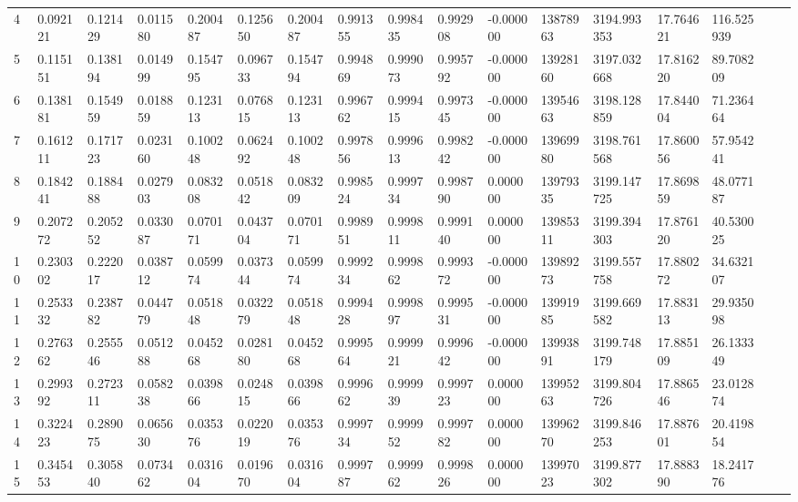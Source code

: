\documentclass{article}
\begin{document}
\begin{center}
\begin{tiny}
\begin{tabular}{|l*{16}{l|}}
4 & 0.092121 & 0.121429 & 0.011580 & 0.200487 & 0.125650 & 0.200487 & 0.991355 & 0.998435 & 0.992908 & -0.000000 & 13878963 & 3194.993353 & 17.764621 & 116.525939 \\
5 & 0.115151 & 0.138194 & 0.014999 & 0.154795 & 0.096733 & 0.154794 & 0.994869 & 0.999073 & 0.995792 & -0.000000 & 13928160 & 3197.032668 & 17.816220 & 89.708209 \\
6 & 0.138181 & 0.154959 & 0.018859 & 0.123113 & 0.076815 & 0.123113 & 0.996762 & 0.999415 & 0.997345 & -0.000000 & 13954663 & 3198.128859 & 17.844004 & 71.236464 \\
7 & 0.161211 & 0.171723 & 0.023160 & 0.100248 & 0.062492 & 0.100248 & 0.997856 & 0.999613 & 0.998242 & -0.000000 & 13969980 & 3198.761568 & 17.860056 & 57.954241 \\
8 & 0.184241 & 0.188488 & 0.027903 & 0.083208 & 0.051842 & 0.083209 & 0.998524 & 0.999734 & 0.998790 & 0.000000 & 13979335 & 3199.147725 & 17.869859 & 48.077187 \\
9 & 0.207272 & 0.205252 & 0.033087 & 0.070171 & 0.043704 & 0.070171 & 0.998951 & 0.999811 & 0.999140 & 0.000000 & 13985311 & 3199.394303 & 17.876120 & 40.530025 \\
10 & 0.230302 & 0.222017 & 0.038712 & 0.059974 & 0.037344 & 0.059974 & 0.999234 & 0.999862 & 0.999372 & -0.000000 & 13989273 & 3199.557758 & 17.880272 & 34.632107 \\
11 & 0.253332 & 0.238782 & 0.044779 & 0.051848 & 0.032279 & 0.051848 & 0.999428 & 0.999897 & 0.999531 & -0.000000 & 13991985 & 3199.669582 & 17.883113 & 29.935098 \\
12 & 0.276362 & 0.255546 & 0.051288 & 0.045268 & 0.028180 & 0.045268 & 0.999564 & 0.999921 & 0.999642 & -0.000000 & 13993891 & 3199.748179 & 17.885109 & 26.133349 \\
13 & 0.299392 & 0.272311 & 0.058238 & 0.039866 & 0.024815 & 0.039866 & 0.999662 & 0.999939 & 0.999723 & 0.000000 & 13995263 & 3199.804726 & 17.886546 & 23.012874 \\
14 & 0.322423 & 0.289075 & 0.065630 & 0.035376 & 0.022019 & 0.035376 & 0.999734 & 0.999952 & 0.999782 & 0.000000 & 13996270 & 3199.846253 & 17.887601 & 20.419854 \\
15 & 0.345453 & 0.305840 & 0.073462 & 0.031604 & 0.019670 & 0.031604 & 0.999787 & 0.999962 & 0.999826 & 0.000000 & 13997023 & 3199.877302 & 17.888390 & 18.241776 \\
\hline
\end{tabular}

\end{tiny}
\end{center}
\end{document}
